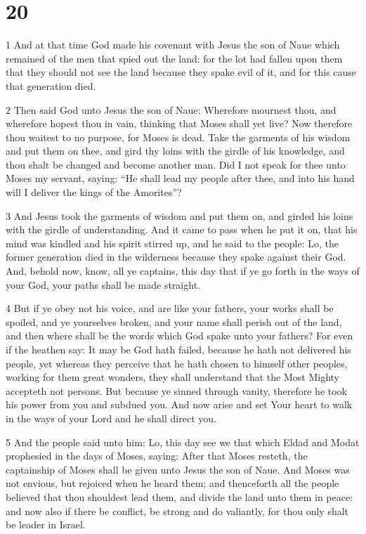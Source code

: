 \chapter{20}

\par 1 And at that time God made his covenant with Jesus the son of Naue which remained of the men that spied out the land: for the lot had fallen upon them that they should not see the land because they spake evil of it, and for this cause that generation died. 

\par 2 Then said God unto Jesus the son of Naue: Wherefore mournest thou, and wherefore hopest thou in vain, thinking that Moses shall yet live? Now therefore thou waitest to no purpose, for Moses is dead. Take the garments of his wisdom and put them on thee, and gird thy loins with the girdle of his knowledge, and thou shalt be changed and become another man. Did I not speak for thee unto Moses my servant, saying: “He shall lead my people after thee, and into his hand will I deliver the kings of the Amorites”? 

\par 3 And Jesus took the garments of wisdom and put them on, and girded his loins with the girdle of understanding. And it came to pass when he put it on, that his mind was kindled and his spirit stirred up, and he said to the people: Lo, the former generation died in the wilderness because they spake against their God. And, behold now, know, all ye captains, this day that if ye go forth in the ways of your God, your paths shall be made straight. 

\par 4 But if ye obey not his voice, and are like your fathers, your works shall be spoiled, and ye yourselves broken, and your name shall perish out of the land, and then where shall be the words which God spake unto your fathers? For even if the heathen say: It may be God hath failed, because he hath not delivered his people, yet whereas they perceive that he hath chosen to himself other peoples, working for them great wonders, they shall understand that the Most Mighty accepteth not persons. But because ye sinned through vanity, therefore he took his power from you and subdued you. And now arise and set Your heart to walk in the ways of your Lord and he shall direct you.

\par 5 And the people said unto him: Lo, this day see we that which Eldad and Modat prophesied in the days of Moses, saying: After that Moses resteth, the captainship of Moses shall be given unto Jesus the son of Naue. And Moses was not envious, but rejoiced when he heard them; and thenceforth all the people believed that thou shouldest lead them, and divide the land unto them in peace: and now also if there be conflict, be strong and do valiantly, for thou only shalt be leader in Israel. 

